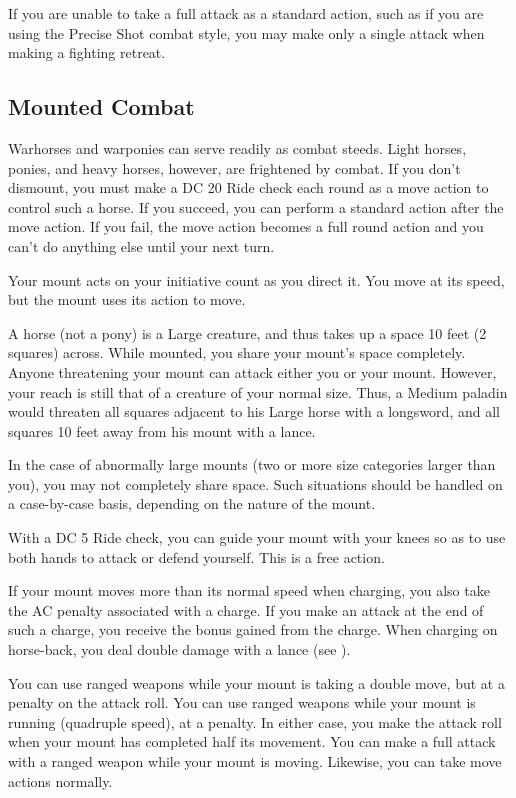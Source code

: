 If you are unable to take a full attack as a standard action, such as if you are using the Precise Shot combat style, you may make only a single attack when making a fighting retreat.

\subsection{Mounted Combat}
 Warhorses and warponies can serve readily as combat steeds. Light horses, ponies, and heavy horses, however, are frightened by combat. If you don't dismount, you must make a DC 20 Ride check each round as a move action to control such a horse. If you succeed, you can perform a standard action after the move action. If you fail, the move action becomes a full round action and you can't do anything else until your next turn.

Your mount acts on your initiative count as you direct it. You move at its speed, but the mount uses its action to move.

 A horse (not a pony) is a Large creature, and thus takes up a space 10 feet (2 squares) across. While mounted, you share your mount's space completely. Anyone threatening your mount can attack either you or your mount. However, your reach is still that of a creature of your normal size. Thus, a Medium paladin would threaten all squares adjacent to his Large horse with a longsword, and all squares 10 feet away from his mount with a lance.

In the case of abnormally large mounts (two or more size categories larger than you), you may not completely share space. Such situations should be handled on a case-by-case basis, depending on the nature of the mount.

 With a DC 5 Ride check, you can guide your mount with your knees so as to use both hands to attack or defend yourself. This is a free action.

If your mount moves more than its normal speed when charging, you also take the AC penalty associated with a charge. If you make an attack at the end of such a charge, you receive the bonus gained from the charge. When charging on horse-back, you deal double damage with a lance (see ).

You can use ranged weapons while your mount is taking a double move, but at a  penalty on the attack roll. You can use ranged weapons while your mount is running (quadruple speed), at a  penalty. In either case, you make the attack roll when your mount has completed half its movement. You can make a full attack with a ranged weapon while your mount is moving. Likewise, you can take move actions normally.

